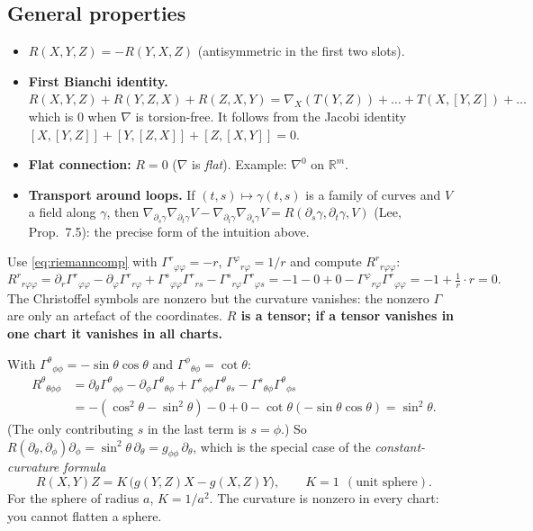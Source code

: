 \documentclass[11pt,a4paper]{article}
\numberwithin{equation}{section}
\theoremstyle{definition}
\theoremstyle{plain}
\newcommand{\R}{\mathbb{R}}
\begin{document}
\subsection{General properties}
\begin{itemize}[nosep]
\item $R(X,Y,Z)=-R(Y,X,Z)$ (antisymmetric in the first two slots).
\item \textbf{First Bianchi identity.} $R(X,Y,Z)+R(Y,Z,X)+R(Z,X,Y)=\nabla_X(T(Y,Z))+\dots+T(X,[Y,Z])+\dots$ which is $0$ when $\nabla$ is torsion-free. It follows from the Jacobi identity $[X,[Y,Z]]+[Y,[Z,X]]+[Z,[X,Y]]=0$.
\item \textbf{Flat connection:} $R=0$ ($\nabla$ is \emph{flat}). Example: $\nabla^0$ on $\R^m$.
\item \textbf{Transport around loops.} If $(t,s)\mapsto\gamma(t,s)$ is a family of curves and $V$ a field along $\gamma$, then $\nabla_{\partial_s\gamma}\nabla_{\partial_t\gamma}V-\nabla_{\partial_t\gamma}\nabla_{\partial_s\gamma}V=R(\partial_s\gamma,\partial_t\gamma,V)$ (Lee, Prop.~7.5): the precise form of the intuition above.
\end{itemize}

\begin{example}
Use \eqref{eq:riemanncomp} with $\Gamma^r{}_{\varphi\varphi}=-r$, $\Gamma^\varphi{}_{r\varphi}=1/r$ and compute $R^r{}_{r\varphi\varphi}$:
\[
R^r{}_{r\varphi\varphi}=\partial_r\Gamma^r{}_{\varphi\varphi}-\partial_\varphi\Gamma^r{}_{r\varphi}+\Gamma^s{}_{\varphi\varphi}\Gamma^r{}_{rs}-\Gamma^s{}_{r\varphi}\Gamma^r{}_{\varphi s}
=-1-0+0-\Gamma^\varphi{}_{r\varphi}\Gamma^r{}_{\varphi\varphi}=-1+\tfrac1r\cdot r=0 .
\]
The Christoffel symbols are nonzero but the curvature vanishes: the nonzero $\Gamma$ are only an artefact of the coordinates. \textbf{$R$ is a tensor; if a tensor vanishes in one chart it vanishes in all charts.}
\end{example}

\begin{example}
With $\Gamma^\theta{}_{\phi\phi}=-\sin\theta\cos\theta$ and $\Gamma^\phi{}_{\theta\phi}=\cot\theta$:
\[
\begin{aligned}R^\theta{}_{\theta\phi\phi}&=\partial_\theta\Gamma^\theta{}_{\phi\phi}-\partial_\phi\Gamma^\theta{}_{\theta\phi}+\Gamma^s{}_{\phi\phi}\Gamma^\theta{}_{\theta s}-\Gamma^s{}_{\theta\phi}\Gamma^\theta{}_{\phi s}\\
&=-(\cos^2\theta-\sin^2\theta)-0+0-\cot\theta(-\sin\theta\cos\theta)=\sin^2\theta .\end{aligned}
\]
(The only contributing $s$ in the last term is $s=\phi$.) So $R(\partial_\theta,\partial_\phi)\partial_\phi=\sin^2\theta\,\partial_\theta=g_{\phi\phi}\,\partial_\theta$, which is the special case of the \emph{constant-curvature formula}
\[
R(X,Y)Z=K\,\big(g(Y,Z)X-g(X,Z)Y\big),\qquad K=1\ \ (\text{unit sphere}).
\]
For the sphere of radius $a$, $K=1/a^2$. The curvature is nonzero in every chart: you cannot flatten a sphere.
\end{example}
\end{document}
